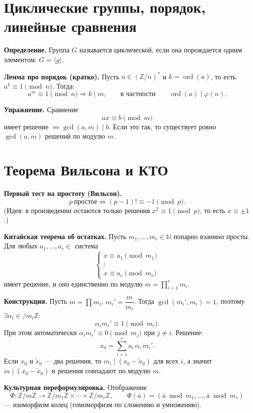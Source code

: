 \documentclass[12pt,a4paper]{article}
\newcommand{\Z}{\mathbb{Z}}
\DeclareMathOperator{\gcdop}{gcd}
\DeclareMathOperator{\ord}{ord}
\begin{document}
\section{Циклические группы, порядок, линейные сравнения}

\textbf{Определение.} Группа $G$ называется циклической, если она порождается одним элементом:
$G=\langle g\rangle$.

\textbf{Лемма про порядок (кратко).}
Пусть $a\in(\Z/n)^{\ast}$ и $k=\ord(a)$, то есть $a^k\equiv 1\pmod n$.
Тогда:
\[
a^m\equiv 1\pmod n \Rightarrow k\mid m,
\qquad\text{в частности}\qquad
\ord(a)\mid \varphi(n).
\]

\textbf{Упражнение.} Сравнение
\[
ax\equiv b \pmod m
\]
имеет решение $\Leftrightarrow \gcdop(a,m)\mid b$.
Если это так, то существует ровно $\gcdop(a,m)$ решений по модулю $m$.

\section{Теорема Вильсона и КТО}

\textbf{Первый тест на простоту (Вильсон).}
\[
p\ \text{простое} \iff (p-1)!\equiv -1\pmod p.
\]
(Идея: в произведении остаются только решения $x^2\equiv 1\pmod p$, то есть $x\equiv\pm1$.)

\textbf{Китайская теорема об остатках.}
Пусть $m_1,\dots,m_r\in \mathbb{N}$ попарно взаимно просты.
Для любых $a_1,\dots,a_r\in$ система
\[
\begin{cases}
x\equiv a_1 \pmod{m_1}\\
\vdots\\
x\equiv a_r \pmod{m_r}
\end{cases}
\]
имеет решение, и оно единственно по модулю $m=\prod_{i=1}^r m_i$.

\textbf{Конструкция.}
Пусть $m=\prod m_i$, $m_i'=\dfrac{m}{m_i}$.
Тогда $\gcdop(m_i',m_i)=1$, поэтому $\exists \alpha_i\in/m_i\Z$:
\[
\alpha_i m_i' \equiv 1\pmod{m_i}.
\]
При этом автоматически $\alpha_i m_i'\equiv 0\pmod{m_j}$ при $j\neq i$.
Решение:
\[
x_0=\sum_{i=1}^r a_i\,\alpha_i\,m_i'.
\]
Если $x_0$ и $\tilde x_0$ — два решения, то $m_i\mid(x_0-\tilde x_0)$ для всех $i$,
а значит $m\mid(x_0-\tilde x_0)$ и решения совпадают по модулю $m$.

\textbf{Культурная переформулировка.}
Отображение
\[
\Phi:\Z/m\Z \to \Z/m_1\Z\times\cdots\times \Z/m_r\Z,\qquad
\Phi(\bar a)=(\bar a\bmod m_1,\dots,\bar a\bmod m_r)
\]
— изоморфизм колец (гомоморфизм по сложению и умножению).
\end{document}
